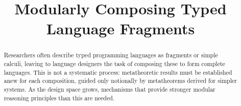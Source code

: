 \documentclass[10pt,preprint]{sigplanconf}
\begin{document}
\conferenceinfo{-}{-} 
\copyrightyear{-} 
\copyrightdata{[to be supplied]} 


\title{Modularly Composing Typed Language Fragments}

\authorinfo{}{}{}

\maketitle
\begin{abstract}
Researchers often describe typed programming languages as fragments or simple calculi, leaving to language designers the task of composing these to form complete languages.  %
This is not a systematic process: metatheoretic results must be established anew for each composition, guided only notionally by metatheorems derived for simpler systems.
As the design space grows, mechanisms that provide stronger modular reasoning principles than this are needed.%



\end{abstract}
\end{document}
